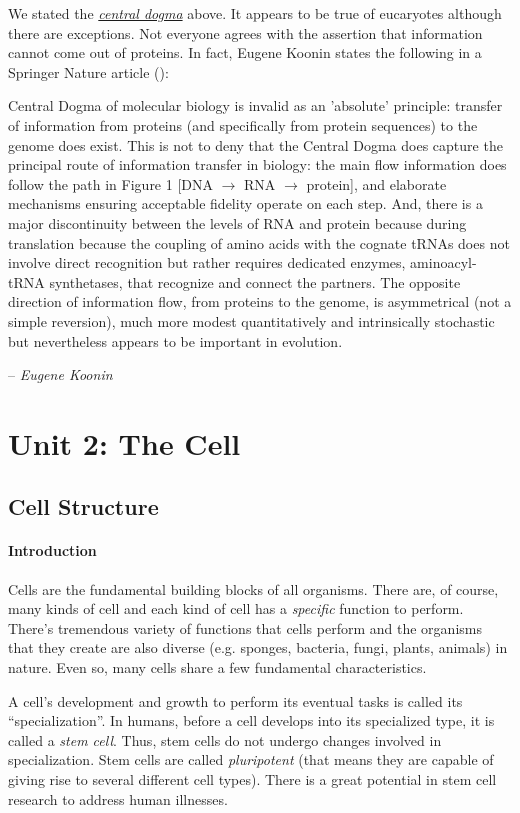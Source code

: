 \documentclass[12pt]{article}
\begin{document}
We stated the \hyperref[para: central-dogma]{\emph{central dogma}} above. It appears to be true of eucaryotes although there are exceptions. Not everyone agrees with the assertion that information cannot come out of proteins. In fact, Eugene Koonin states the following in a Springer Nature article (\cite{koonin}):
\epigraph{
    Central Dogma of molecular biology is invalid as an 'absolute' principle: transfer of information from proteins (and specifically from protein sequences) to the genome does exist. This is not to deny that the Central Dogma does capture the principal route of information transfer in biology: the main flow information does follow the path in Figure 1 [DNA $\rightarrow$ RNA $\rightarrow$ protein], and elaborate mechanisms ensuring acceptable fidelity operate on each step. And, there is a major discontinuity between the levels of RNA and protein because during translation because the coupling of amino acids with the cognate tRNAs does not involve direct recognition but rather requires dedicated enzymes, aminoacyl-tRNA synthetases, that recognize and connect the partners. The opposite direction of information flow, from proteins to the genome, is asymmetrical (not a simple reversion), much more modest quantitatively and intrinsically stochastic but nevertheless appears to be important in evolution.
}
{
    -- \textit{Eugene Koonin} \cite{koonin}}
\section{Unit 2: The Cell}
\subsection{Cell Structure}
\paragraph{Introduction}
Cells are the fundamental building blocks of all organisms. There are, of course, many kinds of cell and each kind of cell has a \emph{specific} function to perform. There's tremendous variety of functions that cells perform and the organisms that they create are also diverse (e.g. sponges, bacteria, fungi, plants, animals) in nature. Even so, many cells share a few fundamental characteristics.

A cell's development and growth to perform its eventual tasks is called its ``specialization''. In humans, before a cell develops into its specialized type, it is called a \emph{stem cell}. Thus, stem cells do not undergo changes involved in specialization. Stem cells are called \emph{pluripotent} (that means they are capable of giving rise to several different cell types). There is a great potential in stem cell research to address human illnesses.
\end{document}

